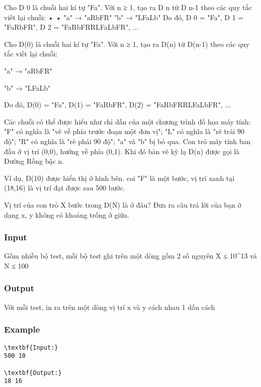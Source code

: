 



     Cho D 0 là chuỗi hai kí tự "Fa". Với n ≥ 1, tạo ra D n từ D n-1 theo các quy tắc viết lại chuỗi:       •       •       "a" → "aRbFR"       "b" → "LFaLb"       Do đó, D 0 = "Fa", D 1 = "FaRbFR", D 2 = "FaRbFRRLFaLbFR", ...    

   Cho D(0) là chuỗi hai kí tự "Fa". Với n ≥ 1, tạo ra D(n) từ D(n-1) theo các quy tắc viết lại chuỗi:  

   "a" → "aRbFR"  

   "b" → "LFaLb"  

   Do đó, D(0) = "Fa", D(1) = "FaRbFR", D(2) = "FaRbFRRLFaLbFR", ...  

   Các chuỗi có thể được hiểu như chỉ dẫn của một chương trình đồ họa máy tính: "F" có nghĩa là "vẽ về phía trước đoạn một đơn vị"; "L" có nghĩa là "rẽ trái 90 độ"; "R" có nghĩa là "rẽ phải 90 độ"; "a" và "b" bị bỏ qua. Con trỏ máy tính ban đầu ở vị trí (0,0), hướng về phía (0,1). Khi đó bản vẽ kỳ lạ D(n) được gọi là Đường Rồng bậc n.  

   Ví dụ, D(10) được hiển thị ở hình bên. coi "F" là một bước, vị trí xanh tại (18,16) là vị trí đạt được sau 500 bước.  

   Vị trí của con trỏ X bước trong D(N) là ở đâu? Đưa ra câu trả lời của bạn ở dạng x, y không có khoảng trống ở giữa.  



\subsubsection{   Input  }

   Gồm nhiều bộ test, mỗi bộ test ghi trên một dòng gồm 2 số nguyên X ≤ 10^13 và N ≤ 100  

\subsubsection{   Output  }

   Với mỗi test, in ra trên một dòng vị trí x và y cách nhau 1 dấu cách  

\subsubsection{   Example  }
\begin{verbatim}
\textbf{Input:}
500 10

\textbf{Output:}
18 16
\end{verbatim}
